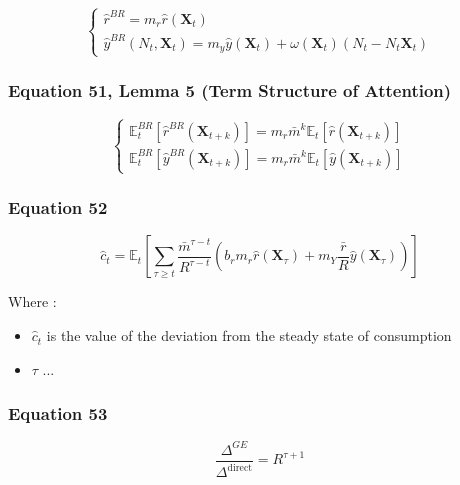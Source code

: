 \documentclass{article}
\begin{document}
\begin{equation}\tag{50}
    \begin{cases}
        \hat{r}^{BR} = m_{r} \hat{r}(\textbf{X}_{t}) \\
        \hat{y}^{BR}(N_{t},\textbf{X}_{t}) = m_{y}\hat{y}(\textbf{X}_{t})+\omega(\textbf{X}_{t})(N_{t}-N_{t}\textbf{X}_{t})
    \end{cases}
\end{equation}

\subsubsection*{Equation 51, Lemma 5 (Term Structure of Attention)}

\begin{equation}\tag{51}
    \begin{cases}
        \mathbb{E}_{t}^{BR}\left[\hat{r}^{BR}(\textbf{X}_{t+k})\right]=m_{r}\bar{m}^{k}\mathbb{E}_{t}\left[\hat{r}(\textbf{X}_{t+k})\right] \\
        \mathbb{E}_{t}^{BR}\left[\hat{y}^{BR}(\textbf{X}_{t+k})\right]=m_{r}\bar{m}^{k}\mathbb{E}_{t}\left[\hat{y}(\textbf{X}_{t+k})\right]
    \end{cases}
\end{equation}

\subsubsection*{Equation 52}

\begin{equation}\tag{52}
        \hat{c}_{t}=\mathbb{E}_{t}\left[\sum_{\tau\geq t}\frac{\bar{m}^{\tau-t}}{R^{\tau-t}}\left(b_{r}m_{r}\hat{r}(\textbf{X}_{\tau})+m_{Y}\frac{\bar{r}}{R}\hat{y}(\textbf{X}_{\tau})\right)\right]
\end{equation}

Where : 
\begin{itemize}
    \item $\hat{c}_{t}$ is the value of the deviation from the steady state of consumption
    \item $\tau$ ...
\end{itemize}

\subsubsection*{Equation 53}

\begin{equation}\tag{53}
    \frac{\Delta^{GE}}{\Delta^{\text{direct}}}=R^{\tau+1}
\end{equation}
    
\end{document}
